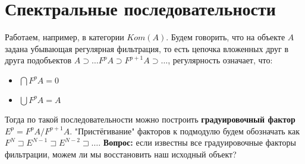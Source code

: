 \documentclass[../main.tex]{subfiles}
\begin{document}
\section{Спектральные последовательности}
Работаем, например, в категории $Kom(A)$. Будем говорить, что на объекте $A$ задана убывающая регулярная фильтрация, то есть цепочка вложенных друг в друга подобъектов $A \supset \ldots F^p A \supset F^{p+1}A \supset \ldots$, регулярность означает, что:
\begin{itemize}
    \item $\bigcap F^p A = 0$ \item  $\bigcup F^p A = A$
\end{itemize}
Тогда по такой последовательности можно построить \textbf{градуировочный фактор} $E^p = F^p A / F^{p+1} A$.
"Пристёгивание" факторов к подмодулю будем обозначать как $F^N \sqsupset E^{N-1} \sqsupset E^{N-2}\sqsupset\ldots$.
\textbf{Вопрос:} если известны все градуировочные факторы фильтрации, можем ли мы восстановить наш исходный объект?
\end{document}

